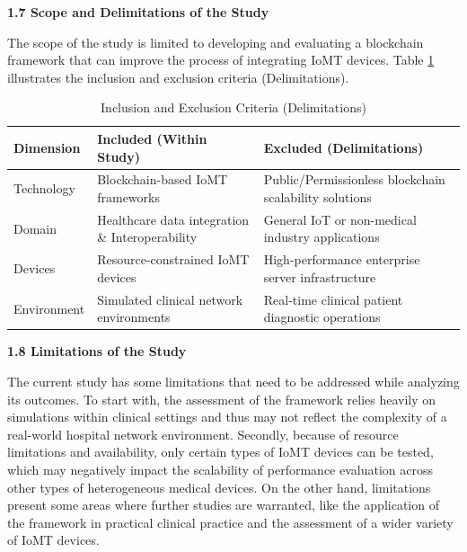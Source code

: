 \documentclass[12pt, a4paper]{report}
\begin{document}
\vspace{0.3cm}
\vspace{0.5cm}
{\color{myblue} \Large \bfseries 1.7 Scope and Delimitations of the Study}

\noindent The scope of the study is limited to developing and evaluating a blockchain framework that can improve the process of integrating IoMT devices. Table \ref{tab:scope_delimitation} illustrates the inclusion and exclusion criteria (Delimitations).


\begin{table}[h!]
    \centering
    \renewcommand{\arraystretch}{1.5} %
    \label{tab:scope_delimitation}
    \begin{tabularx}{\textwidth}{|>{\centering\arraybackslash}p{3cm}|>{\centering\arraybackslash}X|>{\centering\arraybackslash}X|}
        \hline
        \rowcolor{myblue!20} \bfseries Dimension & \bfseries Included (Within Study) & \bfseries Excluded (Delimitations) \tabularnewline \hline
        Technology & Blockchain-based IoMT frameworks & Public/Permissionless blockchain scalability solutions \tabularnewline \hline
        Domain & Healthcare data integration \& Interoperability & General IoT or non-medical industry applications \tabularnewline \hline
        Devices & Resource-constrained IoMT devices & High-performance enterprise server infrastructure \tabularnewline \hline
        Environment & Simulated clinical network environments & Real-time clinical patient diagnostic operations \tabularnewline \hline
    \end{tabularx}
        \caption{Inclusion and Exclusion Criteria (Delimitations)}
\end{table}

\vspace{0.3cm}
\vspace{0.5cm}
{\color{myblue} \Large \bfseries 1.8 Limitations of the Study}

\noindent The current study has some limitations that need to be addressed while analyzing its outcomes. To start with, the assessment of the framework relies heavily on simulations within clinical settings and thus may not reflect the complexity of a real-world hospital network environment. Secondly, because of resource limitations and availability, only certain types of IoMT devices can be tested, which may negatively impact the scalability of performance evaluation across other types of heterogeneous medical devices. On the other hand, limitations present some areas where further studies are warranted, like the application of the framework in practical clinical practice and the assessment of a wider variety of IoMT devices.
\end{document}
